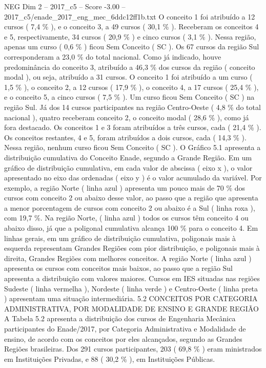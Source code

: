 \begin{textsample}{NEG Dim 2 – 2017\_c5 – Score -3.00 – 2017\_c5/enade\_2017\_eng\_mec\_6ddc12ff1b.txt}
O conceito 1 foi atribuído a 12 cursos ( 7,4 \% ), e o conceito 3, a 49 cursos ( 30,1 \% ).
Receberam os conceitos 4 e 5, respectivamente, 34 cursos ( 20,9 \% ) e cinco cursos ( 3,1 \% ).
Nessa região, apenas um curso ( 0,6 \% ) ficou Sem Conceito ( SC ).
Os 67 cursos da região Sul corresponderam a 23,0 \% do total nacional.
Como já indicado, houve predominância do conceito 3, atribuído a 46,3 \% dos cursos da região ( conceito modal ), ou seja, atribuído a 31 cursos.
O conceito 1 foi atribuído a um curso ( 1,5 \% ), o conceito 2, a 12 cursos ( 17,9 \% ), o conceito 4, a 17 cursos ( 25,4 \% ), e o conceito 5, a cinco cursos ( 7,5 \% ).
Um curso ficou Sem Conceito ( SC ) na região Sul.
Já dos 14 cursos participantes na região Centro-Oeste ( 4,8 \% do total nacional ), quatro receberam conceito 2, o conceito modal ( 28,6 \% ), como já fora destacado.
Os conceitos 1 e 3 foram atribuídos a três cursos, cada ( 21,4 \% ).
Os conceitos restantes, 4 e 5, foram atribuídos a dois cursos, cada ( 14,3 \% ).
Nessa região, nenhum curso ficou Sem Conceito ( SC ).
O Gráfico 5.1 apresenta a distribuição cumulativa do Conceito Enade, segundo a Grande Região.
Em um gráfico de distribuição cumulativa, em cada valor de abscissa ( eixo x ), o valor apresentado no eixo das ordenadas ( eixo y ) é o valor acumulado da variável.
Por exemplo, a região Norte ( linha azul ) apresenta um pouco mais de 70 \% dos cursos com conceito 2 ou abaixo desse valor, ao passo que a região que apresenta a menor porcentagem de cursos com conceito 2 ou abaixo é a Sul ( linha roxa ), com 19,7 \%.
Na região Norte, ( linha azul ) todos os cursos têm conceito 4 ou abaixo disso, já que a poligonal cumulativa alcança 100 \% para o conceito 4.
Em linhas gerais, em um gráfico de distribuição cumulativa, poligonais mais à esquerda representam Grandes Regiões com pior distribuição, e poligonais mais à direita, Grandes Regiões com melhores conceitos.
A região Norte ( linha azul ) apresenta os cursos com conceitos mais baixos, ao passo que a região Sul apresenta a distribuição com valores maiores.
Cursos em IES situadas nas regiões Sudeste ( linha vermelha ), Nordeste ( linha verde ) e Centro-Oeste ( linha preta ) apresentam uma situação intermediária. 5.2 CONCEITOS POR CATEGORIA ADMINISTRATIVA, POR MODALIDADE DE ENSINO E GRANDE REGIÃO A Tabela 5.2 apresenta a distribuição dos cursos de Engenharia Mecânica participantes do Enade/2017, por Categoria Administrativa e Modalidade de ensino, de acordo com os conceitos por eles alcançados, segundo as Grandes Regiões brasileiras.
Dos 291 cursos participantes, 203 ( 69,8 \% ) eram ministrados em Instituições Privadas, e 88 ( 30,2 \% ), em Instituições Públicas.

\end{textsample}
